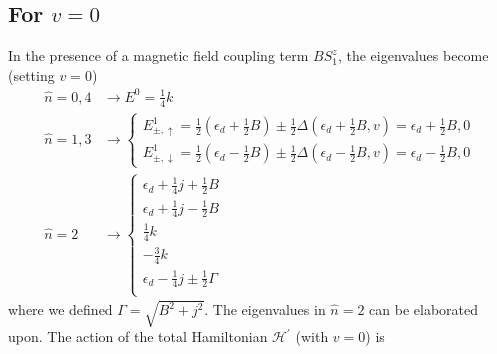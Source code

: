 \documentclass[twoside]{report}
\numberwithin{equation}{section}
\begin{document}
\subsection{For \(v=0\)}
In the presence of a magnetic field coupling term \(B S^z_1\), the eigenvalues become (setting \(v = 0\))
\begin{equation}\begin{aligned}
\hat n=0,4 &\rightarrow E^0 = \frac{1}{4}k\\
\hat n=1,3 &\rightarrow \begin{cases}
	E^1_{\pm, \uparrow} = \frac{1}{2} \left(\epsilon_d + \frac{1}{2}B\right) \pm \frac{1}{2}\Delta\left(\epsilon_d + \frac{1}{2}B, v\right)  = \epsilon_d + \frac{1}{2}B, 0\\ 
	E^1_{\pm, \downarrow} = \frac{1}{2} \left(\epsilon_d - \frac{1}{2}B\right) \pm \frac{1}{2}\Delta\left(\epsilon_d - \frac{1}{2}B, v\right)  = \epsilon_d -\frac{1}{2}B, 0
	\end{cases}\\
	\hat n=2 &\rightarrow \begin{cases}
	\epsilon_d + \frac{1}{4}j + \frac{1}{2}B\\
	\epsilon_d + \frac{1}{4}j - \frac{1}{2}B\\
	\frac{1}{4}k \\
	-\frac{3}{4}k \\
	\epsilon_d -\frac{1}{4}j \pm \frac{1}{2} \Gamma \\
\end{cases}
\end{aligned}\end{equation}
where we defined \(\Gamma = \sqrt{B^2 + j^2}\). The eigenvalues in \(\hat n=2\) can be elaborated upon. The action of the total Hamiltonian \(\mathcal{H}^\prime\) (with \(v=0\)) is
\end{document}
